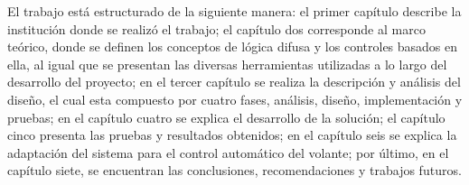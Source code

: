El trabajo está estructurado de la siguiente manera: el primer capítulo describe la institución donde se realizó el trabajo; el capítulo dos corresponde al marco teórico, donde se definen los conceptos de lógica difusa y los controles basados en ella, al igual que se presentan las diversas herramientas utilizadas a lo largo del desarrollo del proyecto; en el tercer capítulo se realiza la descripción y análisis del diseño, el cual esta compuesto por cuatro fases, análisis, diseño, implementación y pruebas; en el capítulo cuatro se explica el desarrollo de la solución; el capítulo cinco presenta las pruebas y resultados obtenidos; en el capítulo seis se explica la adaptación del sistema para el control automático del volante; por último, en el capítulo siete, se encuentran las conclusiones, recomendaciones y trabajos futuros.